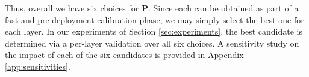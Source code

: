 \documentclass{article}
\theoremstyle{plain}
\begin{document}
Thus, overall we have six choices for $\mathbf{P}$. Since each can be obtained as part of a fast and pre-deployment calibration phase, we may simply select the best one for each layer. In our experiments of Section \ref{sec:experiments}, the best candidate is determined via a per-layer validation over all six choices. A sensitivity study on the impact of each of the six candidates is provided in Appendix \ref{app:sensitivities}.

\end{document}
